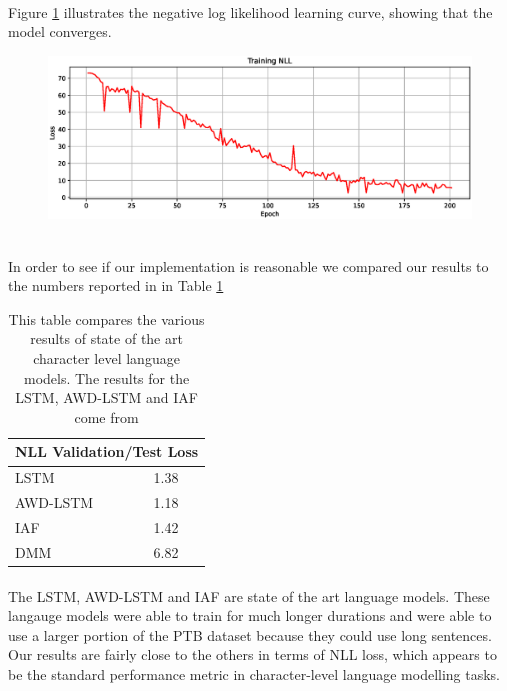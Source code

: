 \documentclass[justified,nobib]{tufte-handout}
\begin{document}
\begin{fullwidth}
\paragraph{} Figure \ref{fig:loss} illustrates the negative log likelihood learning curve, showing that the model converges. 
\begin{figure}[h]
\caption{}
\centering
\includegraphics[width=\textwidth]{./media/loss.eps}
\label{fig:loss}
\end{figure}\\
In order to see if our implementation is reasonable we compared our results to the numbers reported in \cite{discreteflow} in Table \ref{tab:results}\\
\begin{center} 
\begin{table}[htp]
\label{tab:results}
\begin{tabular}{ll}
\hline
\multicolumn{2}{c}{NLL Validation/Test Loss} \\ \hline
\multicolumn{1}{l|}{LSTM} & 1.38  \\ \hline
\multicolumn{1}{l|}{AWD-LSTM} & 1.18  \\ \hline
\multicolumn{1}{l|}{IAF} & 1.42  \\ \hline
\multicolumn{1}{l|}{DMM} & 6.82 \\ \hline
\end{tabular}
\caption{This table compares the various results of state of the art character level language models. The results for the LSTM, AWD-LSTM and IAF come from \cite{discreteflow}}
\end{table}
\end{center}
\paragraph{} The LSTM, AWD-LSTM and IAF are state of the art language models. These langauge models were able to train for much longer durations and were able to use a larger portion of the PTB dataset because they could use long sentences. Our results are fairly close to the others in terms of NLL loss, which appears to be the standard performance metric in character-level language modelling tasks.


\end{fullwidth}
\end{document}
